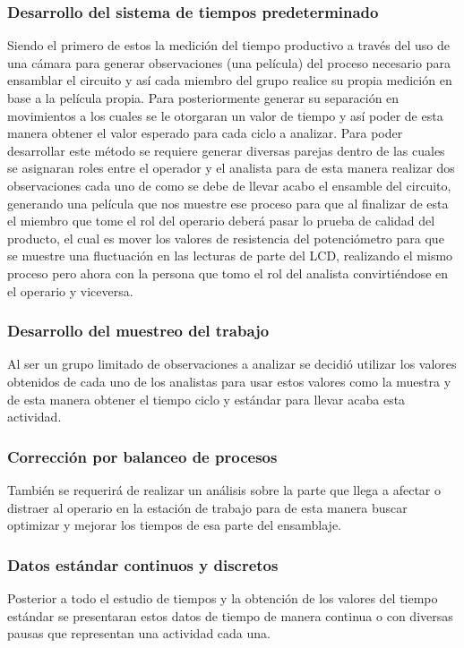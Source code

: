 \subsubsection{Desarrollo del sistema de tiempos predeterminado}

        Siendo el primero de estos la medición del tiempo productivo a través del uso de una cámara para generar observaciones (una película) del proceso necesario para ensamblar el circuito y así cada miembro del grupo realice su propia medición en base a la película propia. Para posteriormente generar su separación en movimientos a los cuales se le otorgaran un valor de tiempo y así poder de esta manera obtener el valor esperado para cada ciclo a analizar. 
        Para poder desarrollar este método se requiere generar diversas parejas dentro de las cuales se asignaran roles entre el operador y el analista para de esta manera realizar dos observaciones cada uno de como se debe de llevar acabo el ensamble del circuito, generando una película que nos muestre ese proceso para que al finalizar de esta el miembro que tome el rol del operario deberá pasar lo prueba de calidad del producto, el cual es mover los valores de resistencia del potenciómetro para que se muestre una fluctuación en las lecturas de parte del LCD, realizando el mismo proceso pero ahora con la persona que tomo el rol del analista convirtiéndose en el operario y viceversa.
\subsubsection{Desarrollo del muestreo del trabajo}
Al ser un grupo limitado de observaciones a analizar se decidió utilizar los valores obtenidos de cada uno de los analistas para usar estos valores como la muestra y de esta manera obtener el tiempo ciclo y estándar para llevar acaba esta actividad.

\subsubsection{Corrección por balanceo de procesos}
También se requerirá de realizar un análisis sobre la parte que llega a afectar o distraer al operario en la estación de trabajo para de esta manera buscar optimizar y mejorar los tiempos de esa parte del ensamblaje.

\subsubsection{Datos estándar continuos y discretos}
Posterior a todo el estudio de tiempos y la obtención de los valores del tiempo estándar se presentaran estos datos de tiempo de manera continua o con diversas pausas que representan una actividad cada una.

